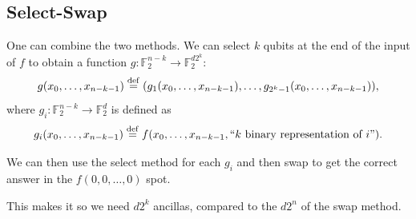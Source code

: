 \documentclass[12pt]{amsart}
\theoremstyle{plain}
\theoremstyle{definition}
\theoremstyle{remark}
\newcommand{\F}{\mathbb{F}}
\newcommand{\idef}{\overset{{\rm def}}{=}}
\begin{document}
\subsection{Select-Swap}

One can combine the two methods.  We can select $k$ qubits at the end of the input of $f$ to obtain a function $g : \F_2^{n-k} \to \F_2^{d2^k}$:
\[
  g(x_0, \ldots , x_{n-k-1}) \idef (g_1(x_0, \ldots , x_{n-k-1}), \ldots, g_{2^k-1}(x_0, \ldots , x_{n-k-1})),
\]
where $g_i : \F_2^{n-k} \to \F_2^d$ is defined as
\[
  g_i(x_0, \ldots , x_{n-k-1}) \idef f(x_0, \ldots ,x_{n-k-1}, \text{``$k$ binary representation of $i$''}).
\]

We can then use the select method for each $g_i$ and then swap to get the correct answer in the $f(0,0, \ldots , 0)$ spot.

This makes it so we need $d2^{k}$ ancillas, compared to the $d2^n$ of the swap method.
\end{document}
